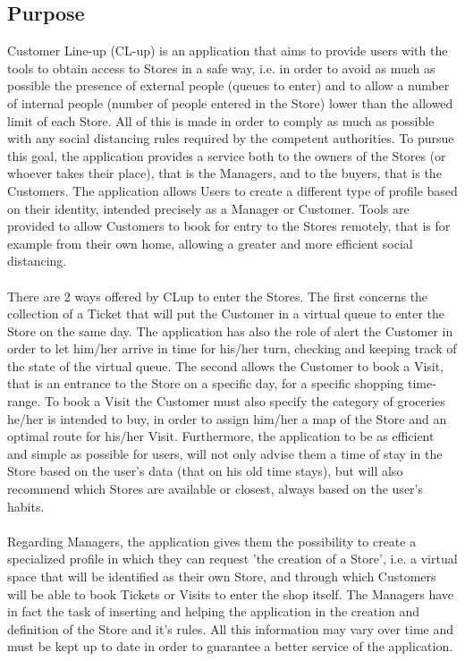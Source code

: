 \documentclass[a4paper, 10pt, oneside]{article}
\begin{document}
\subsection{Purpose}
\label{intro:purpose}
Customer Line-up (CL-up) is an application that aims to provide users with the tools to obtain access to Stores in a safe way, i.e. in order to avoid as much as possible the presence of external people (queues to enter) and to allow a number of internal people (number of people entered in the Store) lower than the allowed limit of each Store. All of this is made in order to comply as much as possible with any social distancing rules required by the competent authorities. To pursue this goal, the application provides a service both to the owners of the Stores (or whoever takes their place), that is the Managers, and to the buyers, that is the Customers. The application allows Users to create a different type of profile based on their identity, intended precisely as a Manager or Customer. Tools are provided to allow Customers to book for entry to the Stores remotely, that is for example from their own home, allowing a greater and more efficient social distancing.\\
\\
There are 2 ways offered by CLup to enter the Stores. The first concerns the collection of a Ticket that will put the Customer in a virtual queue to enter the Store on the same day. The application has also the role of alert the Customer in order to let him/her arrive in time for his/her turn, checking and keeping track of the state of the virtual queue. The second allows the Customer to book a Visit, that is an entrance to the Store on a specific day, for a specific shopping time-range. To book a Visit the Customer must also specify the category of groceries he/her is intended to buy, in order to assign him/her a map of the Store and an optimal route for his/her Visit. Furthermore, the application to be as efficient and simple as possible for users, will not only advise them a time of stay in the Store based on the user's data (that on his old time stays), but will also recommend which Stores are available or closest, always based on the user's habits.\\
\\
Regarding Managers, the application gives them the possibility to create a specialized profile in which they can request 'the creation of a Store', i.e. a virtual space that will be identified as their own Store, and through which Customers will be able to book Tickets or Visits to enter the shop itself. The Managers have in fact the task of inserting and helping the application in the creation and definition of the Store and it's rules. All this information may vary over time and must be kept up to date in order to guarantee a better service of the application.\\
\end{document}
